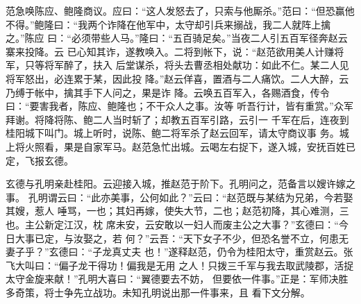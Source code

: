 范急唤陈应、鲍隆商议。应曰：“这人发怒去了，只索与他厮杀。”范曰：“但恐赢他
不得。”鲍隆曰：“我两个诈降在他军中，太守却引兵来搦战，我二人就阵上擒之。”陈应
曰：“必须带些人马。”隆曰：“五百骑足矣。”当夜二人引五百军径奔赵云寨来投降。云
已心知其诈，遂教唤入。二将到帐下，说：“赵范欲用美人计赚将军，只等将军醉了，扶入
后堂谋杀，将头去曹丞相处献功：如此不仁。某二人见将军怒出，必连累于某，因此投
降。”赵云佯喜，置酒与二人痛饮。二人大醉，云乃缚于帐中，擒其手下人问之，果是诈
降。云唤五百军入，各赐酒食，传令曰：“要害我者，陈应、鲍隆也；不干众人之事。汝等
听吾行计，皆有重赏。”众军拜谢。将降将陈、鲍二人当时斩了；却教五百军引路，云引一
千军在后，连夜到桂阳城下叫门。城上听时，说陈、鲍二将军杀了赵云回军，请太守商议事
务。城上将火照看，果是自家军马。赵范急忙出城。云喝左右捉下，遂入城，安抚百姓已
定，飞报玄德。

玄德与孔明亲赴桂阳。云迎接入城，推赵范于阶下。孔明问之，范备言以嫂许嫁之事。
孔明谓云曰：“此亦美事，公何如此？”云曰：“赵范既与某结为兄弟，今若娶其嫂，惹人
唾骂，一也；其妇再嫁，使失大节，二也；赵范初降，其心难测，三也。主公新定江汉，枕
席未安，云安敢以一妇人而废主公之大事？”玄德曰：“今日大事已定，与汝娶之，若
何？”云吾：“天下女子不少，但恐名誉不立，何患无妻子乎？”玄德曰：“子龙真丈夫
也！”遂释赵范，仍令为桂阳太守，重赏赵云。张飞大叫曰：“偏子龙干得功！偏我是无用
之人！只拨三千军与我去取武陵郡，活捉太守金旋来献！”孔明大喜曰：“翼德要去不妨，
但要依一件事。”正是：军师决胜多奇策，将士争先立战功。未知孔明说出那一件事来，且
看下文分解。